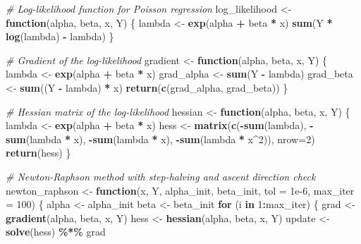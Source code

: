 \documentclass[
]{article}
\newenvironment{Shaded}{\begin{snugshade}}{\end{snugshade}}
\newcommand{\AttributeTok}[1]{\textcolor[rgb]{0.13,0.29,0.53}{#1}}
\newcommand{\CommentTok}[1]{\textcolor[rgb]{0.56,0.35,0.01}{\textit{#1}}}
\newcommand{\ControlFlowTok}[1]{\textcolor[rgb]{0.13,0.29,0.53}{\textbf{#1}}}
\newcommand{\DecValTok}[1]{\textcolor[rgb]{0.00,0.00,0.81}{#1}}
\newcommand{\FloatTok}[1]{\textcolor[rgb]{0.00,0.00,0.81}{#1}}
\newcommand{\FunctionTok}[1]{\textcolor[rgb]{0.13,0.29,0.53}{\textbf{#1}}}
\newcommand{\NormalTok}[1]{#1}
\newcommand{\OtherTok}[1]{\textcolor[rgb]{0.56,0.35,0.01}{#1}}
\newcommand{\SpecialCharTok}[1]{\textcolor[rgb]{0.81,0.36,0.00}{\textbf{#1}}}
\begin{document}
\begin{Shaded}
\begin{Highlighting}[]
\CommentTok{\# Log{-}likelihood function for Poisson regression}
\NormalTok{log\_likelihood }\OtherTok{\textless{}{-}} \ControlFlowTok{function}\NormalTok{(alpha, beta, x, Y) \{}
\NormalTok{  lambda }\OtherTok{\textless{}{-}} \FunctionTok{exp}\NormalTok{(alpha }\SpecialCharTok{+}\NormalTok{ beta }\SpecialCharTok{*}\NormalTok{ x)}
  \FunctionTok{sum}\NormalTok{(Y }\SpecialCharTok{*} \FunctionTok{log}\NormalTok{(lambda) }\SpecialCharTok{{-}}\NormalTok{ lambda)}
\NormalTok{\}}

\CommentTok{\# Gradient of the log{-}likelihood}
\NormalTok{gradient }\OtherTok{\textless{}{-}} \ControlFlowTok{function}\NormalTok{(alpha, beta, x, Y) \{}
\NormalTok{  lambda }\OtherTok{\textless{}{-}} \FunctionTok{exp}\NormalTok{(alpha }\SpecialCharTok{+}\NormalTok{ beta }\SpecialCharTok{*}\NormalTok{ x)}
\NormalTok{  grad\_alpha }\OtherTok{\textless{}{-}} \FunctionTok{sum}\NormalTok{(Y }\SpecialCharTok{{-}}\NormalTok{ lambda)}
\NormalTok{  grad\_beta }\OtherTok{\textless{}{-}} \FunctionTok{sum}\NormalTok{((Y }\SpecialCharTok{{-}}\NormalTok{ lambda) }\SpecialCharTok{*}\NormalTok{ x)}
  \FunctionTok{return}\NormalTok{(}\FunctionTok{c}\NormalTok{(grad\_alpha, grad\_beta))}
\NormalTok{\}}

\CommentTok{\# Hessian matrix of the log{-}likelihood}
\NormalTok{hessian }\OtherTok{\textless{}{-}} \ControlFlowTok{function}\NormalTok{(alpha, beta, x, Y) \{}
\NormalTok{  lambda }\OtherTok{\textless{}{-}} \FunctionTok{exp}\NormalTok{(alpha }\SpecialCharTok{+}\NormalTok{ beta }\SpecialCharTok{*}\NormalTok{ x)}
\NormalTok{  hess }\OtherTok{\textless{}{-}} \FunctionTok{matrix}\NormalTok{(}\FunctionTok{c}\NormalTok{(}\SpecialCharTok{{-}}\FunctionTok{sum}\NormalTok{(lambda), }\SpecialCharTok{{-}}\FunctionTok{sum}\NormalTok{(lambda }\SpecialCharTok{*}\NormalTok{ x),}
                   \SpecialCharTok{{-}}\FunctionTok{sum}\NormalTok{(lambda }\SpecialCharTok{*}\NormalTok{ x), }\SpecialCharTok{{-}}\FunctionTok{sum}\NormalTok{(lambda }\SpecialCharTok{*}\NormalTok{ x}\SpecialCharTok{\^{}}\DecValTok{2}\NormalTok{)), }\AttributeTok{nrow=}\DecValTok{2}\NormalTok{)}
  \FunctionTok{return}\NormalTok{(hess)}
\NormalTok{\}}

\CommentTok{\# Newton{-}Raphson method with step{-}halving and ascent direction check}
\NormalTok{newton\_raphson }\OtherTok{\textless{}{-}} \ControlFlowTok{function}\NormalTok{(x, Y, alpha\_init, beta\_init, }\AttributeTok{tol =} \FloatTok{1e{-}6}\NormalTok{, }\AttributeTok{max\_iter =} \DecValTok{100}\NormalTok{) \{}
\NormalTok{  alpha }\OtherTok{\textless{}{-}}\NormalTok{ alpha\_init}
\NormalTok{  beta }\OtherTok{\textless{}{-}}\NormalTok{ beta\_init}
  \ControlFlowTok{for}\NormalTok{ (i }\ControlFlowTok{in} \DecValTok{1}\SpecialCharTok{:}\NormalTok{max\_iter) \{}
\NormalTok{    grad }\OtherTok{\textless{}{-}} \FunctionTok{gradient}\NormalTok{(alpha, beta, x, Y)}
\NormalTok{    hess }\OtherTok{\textless{}{-}} \FunctionTok{hessian}\NormalTok{(alpha, beta, x, Y)}
\NormalTok{    update }\OtherTok{\textless{}{-}} \FunctionTok{solve}\NormalTok{(hess) }\SpecialCharTok{\%*\%}\NormalTok{ grad}
    

\end{Highlighting}
\end{Shaded}
\end{document}
